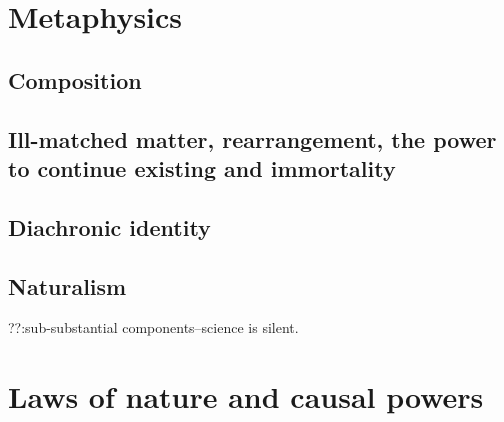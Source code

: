\def\mychapter{VIII}

\chapter{Metaphysics}\label{ch:metaphysics}
\section{Composition}
\section{Ill-matched matter, rearrangement, the power to continue existing and immortality}
\section{Diachronic identity}
\section{Naturalism}
??:sub-substantial components--science is silent.

\chaptertail 

\def\mychapter{IX}

\chapter{Laws of nature and causal powers}\label{ch:laws}
\chaptertail

